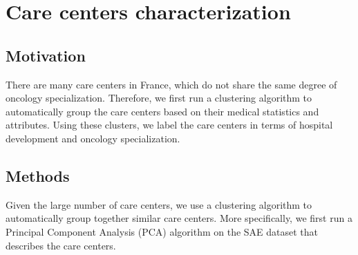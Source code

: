\chapter{Care centers characterization}

\section{Motivation}

There are many care centers in France, which do not share the same degree of oncology specialization. Therefore, we first run a clustering algorithm to automatically group the care centers based on their medical statistics and attributes. Using these clusters, we label the care centers in terms of hospital development and oncology specialization.

\section{Methods}

Given the large number of care centers, we use a clustering algorithm to automatically group together similar care centers. More specifically, we first run a Principal Component Analysis (PCA) algorithm on the SAE dataset that describes the care centers.

